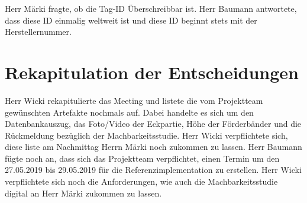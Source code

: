 \documentclass[parskip=full, a4paper]{scrreprt}
\begin{document}
Herr Märki fragte, ob die Tag-ID Überschreibbar ist. Herr Baumann antwortete, dass diese ID einmalig weltweit ist und diese ID beginnt stets mit der Herstellernummer.

\chapter{Rekapitulation der Entscheidungen}
Herr Wicki rekapitulierte das Meeting und listete die vom Projektteam gewünschten Artefakte nochmals auf. Dabei handelte es sich um den Datenbankauszug, das Foto/Video der Eckpartie, Höhe der Förderbänder und die Rückmeldung bezüglich der Machbarkeitsstudie. Herr Wicki verpflichtete sich, diese liste am Nachmittag Herrn Märki noch zukommen zu lassen. Herr Baumann fügte noch an, dass sich das Projektteam verpflichtet, einen Termin um den 27.05.2019 bis 29.05.2019 für die Referenzimplementation zu erstellen.  Herr Wicki verpflichtete sich noch die Anforderungen, wie auch die Machbarkeitsstudie digital an Herr Märki zukommen zu lassen.
\end{document}
